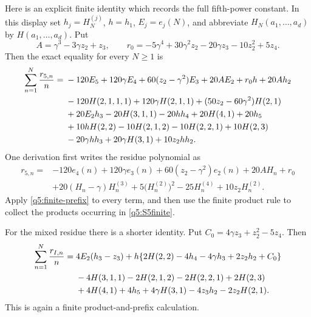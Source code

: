 \documentclass[11pt,a4paper]{article}
\numberwithin{equation}{section}
\theoremstyle{definition}
\begin{document}
Here is an explicit finite identity which records the full fifth-power
constant.  In this display set $h_j=H_N^{(j)}$, $h=h_1$,
$E_j=e_j(N)$, and abbreviate $H_N(a_1,\ldots,a_d)$ by
$H(a_1,\ldots,a_d)$.  Put
\[
 A=\gamma^3-3\gamma z_2+z_3,\qquad
 r_0=-5\gamma^4+30\gamma^2z_2-20\gamma z_3-10z_2^2+5z_4.
\]
Then the exact equality for every $N\geq1$ is
\begin{align}\label{q5:S5finite}
 \sum_{n=1}^N\frac{r_{5,n}}n={}&
  -120E_5+120\gamma E_4+60(z_2-\gamma^2)E_3
       +20AE_2+r_0h+20Ah_2\notag\\
 &-120H(2,1,1,1)+120\gamma H(2,1,1)
       +(50z_2-60\gamma^2)H(2,1)\notag\\
 &+20E_2h_3-20H(3,1,1)-20hh_4
       +20H(4,1)+20h_5\notag\\
 &+10hH(2,2)-10H(2,1,2)-10H(2,2,1)+10H(2,3)\notag\\
 &-20\gamma hh_3+20\gamma H(3,1)+10z_2hh_2.
\end{align}
One derivation first writes the residue polynomial as
\begin{align*}
 r_{5,n}={}&-120e_4(n)+120\gamma e_3(n)
       +60(z_2-\gamma^2)e_2(n)+20A H_n+r_0\\
 &+20(H_n-\gamma)H_n^{(3)}
       +5\bigl(H_n^{(2)}\bigr)^2-25H_n^{(4)}+10z_2H_n^{(2)}.
\end{align*}
Apply \eqref{q5:finite-prefix} to every term, and then use the finite
product rule to collect the products occurring in \eqref{q5:S5finite}.

For the mixed residue there is a shorter identity.  Put
$C_0=4\gamma z_3+z_2^2-5z_4$.  Then
\begin{align}\label{q5:SIfinite}
 \sum_{n=1}^N\frac{r_{I,n}}n={}&
 4E_2(h_3-z_3)
 +h\{2H(2,2)-4h_4-4\gamma h_3+2z_2h_2+C_0\}\notag\\
 &-4H(3,1,1)-2H(2,1,2)-2H(2,2,1)+2H(2,3)\notag\\
 &+4H(4,1)+4h_5+4\gamma H(3,1)-4z_3h_2-2z_2H(2,1).
\end{align}
This is again a finite product-and-prefix calculation.
\end{document}
